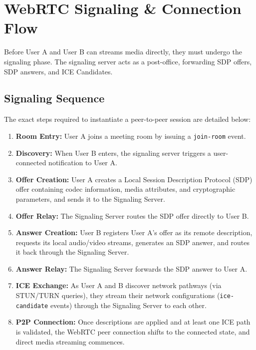 \documentclass[11pt,a4paper]{article}
\begin{document}
\newpage

\section{WebRTC Signaling \& Connection Flow}

Before User A and User B can streams media directly, they must undergo the signaling phase. The signaling server acts as a post-office, forwarding SDP offers, SDP answers, and ICE Candidates.

\subsection{Signaling Sequence}
The exact steps required to instantiate a peer-to-peer session are detailed below:
\begin{enumerate}
    \item \textbf{Room Entry:} User A joins a meeting room by issuing a \texttt{join-room} event.
    \item \textbf{Discovery:} When User B enters, the signaling server triggers a user-connected notification to User A.
    \item \textbf{Offer Creation:} User A creates a Local Session Description Protocol (SDP) offer containing codec information, media attributes, and cryptographic parameters, and sends it to the Signaling Server.
    \item \textbf{Offer Relay:} The Signaling Server routes the SDP offer directly to User B.
    \item \textbf{Answer Creation:} User B registers User A's offer as its remote description, requests its local audio/video streams, generates an SDP answer, and routes it back through the Signaling Server.
    \item \textbf{Answer Relay:} The Signaling Server forwards the SDP answer to User A.
    \item \textbf{ICE Exchange:} As User A and B discover network pathways (via STUN/TURN queries), they stream their network configurations (\texttt{ice-candidate} events) through the Signaling Server to each other.
    \item \textbf{P2P Connection:} Once descriptions are applied and at least one ICE path is validated, the WebRTC peer connection shifts to the connected state, and direct media streaming commences.
\end{enumerate}
\end{document}
